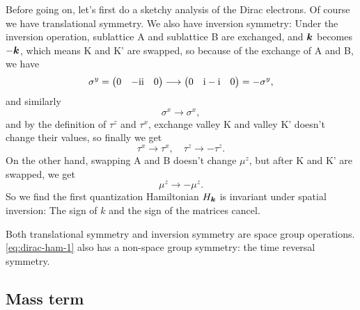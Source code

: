 \documentclass[hyperref, a4paper]{article}
\newcommand*{\ii}{\mathrm{i}}
\def\\{}%
\begin{document}
Before going on, let's first do a sketchy analysis of the Dirac electrons.
Of course we have translational symmetry.
We also have inversion symmetry:
Under the inversion operation, sublattice A and sublattice B are exchanged,
and $\vb*{k}$ becomes $- \vb*{k}$,
which means K and K' are swapped,
so because of the exchange of A and B, we have
\[
    \sigma^y = \pmqty{0 & - \ii \\ \ii & 0} \longrightarrow \pmqty{0 & \ii \\ - \ii & 0} = - \sigma^y,
\]
and similarly 
\[
    \sigma^x \longrightarrow \sigma^x,
\]
and by the definition of $\tau^z$ and $\tau^x$, 
exchange valley K and valley K' doesn't change their values, so finally we get
\begin{equation}
    \tau^x \to \tau^x, \quad \tau^z \to - \tau^z.
\end{equation}
On the other hand, swapping A and B doesn't change $\mu^z$,
but after K and K' are swapped, we get 
\begin{equation}
    \mu^z \to - \mu^z.
\end{equation}
So we find the first quantization Hamiltonian $H_{\vb*{k}}$ is invariant under spatial inversion:
The sign of $k$ and the sign of the matrices cancel.

Both translational symmetry and inversion symmetry are space group operations.
\eqref{eq:dirac-ham-1} also has a non-space group symmetry:
the time reversal symmetry.


\subsection{Mass term}
\end{document}
